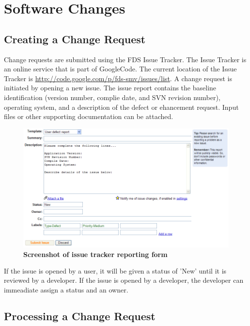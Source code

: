 \documentclass[11pt]{book}
\begin{document}
\section{Software Changes}

\subsection{Creating a Change Request}

Change requests are submitted using the FDS Issue Tracker.  The Issue Tracker is an online service that is part of
GoogleCode.  The current location of the Issue Tracker is \href{http://code.google.com/p/fds-smv/issues/list}
{{\ct http://code.google.com/p/fds-smv/issues/list}}.  A change request is initiated by opening a new issue.
The issue report contains the baseline identification (version number, complie date, and SVN revision number),
operating system, and a description of the defect or ehancement request.  Input files or other supporting 
documentation can be attached.

\begin{figure}[ht!]
\includegraphics[width=\textwidth]{FIGURES/defectreport.jpg}
\caption{\bf Screenshot of issue tracker reporting form}
\label{fig:issueform}
\end{figure}

If the issue is opened by a user, it will be given a status of 'New' until it is reviewed by a developer.  If the
issue is opened by a developer, the developer can immeadiate assign a status and an owner.

\subsection{Processing a Change Request}
\end{document}
